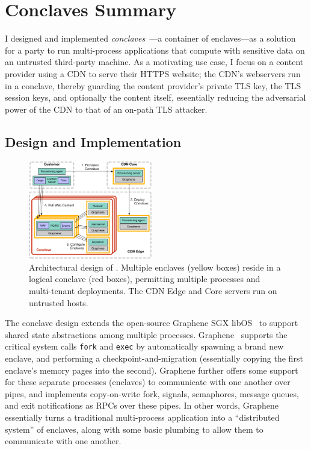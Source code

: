 \section{Conclaves Summary}
\label{sec:conclaves-summary}

I designed and implemented \emph{conclaves}~\cite{phoenix-conclaves}---a
container of enclaves---as a solution for a party to run multi-process
applications that compute with sensitive data on an untrusted third-party
machine.
%
As a motivating use case, I focus on a content provider using a CDN to serve
their HTTPS website; the CDN's webservers run in a conclave, thereby guarding
the content provider's private TLS key, the TLS session keys, and optionally
the content itself, eseentially reducing the adversarial power of the CDN to
that of an on-path TLS attacker.

\subsection{Design and Implementation}


\begin{figure}
\centering
\includegraphics[width=0.48\textwidth]{figs/phoenix-design}
	\caption{Architectural design of \name. Multiple enclaves (yellow
	boxes) reside in a logical conclave (red boxes), permitting
	multiple processes and multi-tenant deployments. The CDN Edge and
	Core servers run on untrusted hosts.}
\label{fig:design}
\end{figure}


The conclave design extends the open-source Graphene SGX libOS~\cite{graphene}
to support shared state abstractions among multiple processes.
%
Graphene~\cite{graphene} supports the critical system calls
\texttt{fork} and \texttt{exec} by automatically spawning a brand new
enclave, and performing a checkpoint-and-migration (essentially copying
the first enclave's memory pages into the second).
%
Graphene further offers some support for these separate processes
(enclaves) to communicate with one another over pipes, and implements
copy-on-write fork, signals, semaphores, message queues, and exit
notifications as RPCs over these pipes.
%
In other words, Graphene essentially turns a traditional multi-process
application into a ``distributed system'' of enclaves, along with some
basic plumbing to allow them to communicate with one another.


